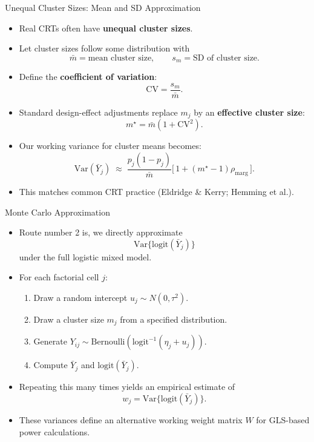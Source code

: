 \documentclass[aspectratio=169]{beamer} %
\begin{document}
\begin{frame}{Unequal Cluster Sizes: Mean and SD Approximation}

\begin{itemize}

  \item Real CRTs often have \textbf{unequal cluster sizes}.
  
  \item Let cluster sizes follow some distribution with
    \[
      \bar m = \text{mean cluster size}, 
      \qquad
      s_m = \text{SD of cluster size}.
    \]

  \item Define the \textbf{coefficient of variation}:
    \[
      \text{CV} = \frac{s_m}{\bar m}.
    \]

  \item Standard design-effect adjustments replace $m_j$ by an
        \textbf{effective cluster size}:
    \[
      m^\star = \bar m(1 + \text{CV}^2).
    \]

  \item Our working variance for cluster means becomes:
    \[
      \mathrm{Var}(\bar Y_j)
        \;\approx\;
        \frac{p_j(1-p_j)}{\bar m}
        \Big[\,1 + (m^\star - 1)\rho_{\text{marg}}\,\Big].
    \]

  \item This matches common CRT practice (Eldridge \& Kerry; Hemming et al.).
\end{itemize}

\end{frame}
\begin{frame}{Monte Carlo Approximation}

\begin{itemize}
  \item Route number 2 is, we directly approximate
    \[
      \mathrm{Var}\{\text{logit}(\bar Y_j)\}
    \]
    under the full logistic mixed model.

  \item For each factorial cell $j$:
    \begin{enumerate}
      \item Draw a random intercept $u_j \sim N(0,\tau^2)$.
      \item Draw a cluster size $m_j$ from a specified distribution.
      \item Generate $Y_{ij} \sim \text{Bernoulli}(\text{logit}^{-1}(\eta_j + u_j))$.
      \item Compute $\bar Y_j$ and $\text{logit}(\bar Y_j)$.
    \end{enumerate}

  \item Repeating this many times yields an empirical estimate of
    \[
      w_j = \mathrm{Var}\{\text{logit}(\bar Y_j)\}.
    \]

  \item These variances define an alternative working weight matrix $W$
        for GLS-based power calculations.
\end{itemize}

\end{frame}
\end{document}
